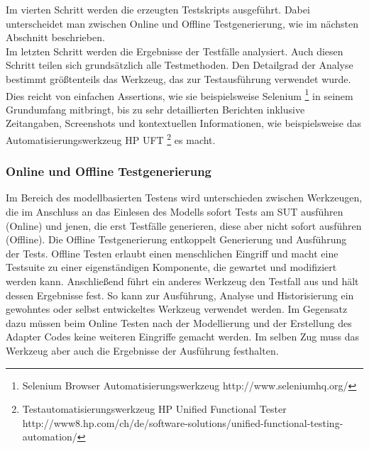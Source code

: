 Im vierten Schritt werden die erzeugten Testskripts ausgeführt. Dabei unterscheidet man zwischen Online und Offline Testgenerierung, wie im nächsten Abschnitt beschrieben.\\
Im letzten Schritt werden die Ergebnisse der Testfälle analysiert. Auch diesen Schritt teilen sich grundsätzlich alle Testmethoden. Den Detailgrad der Analyse bestimmt größtenteils das Werkzeug, das zur Testausführung verwendet wurde. Dies reicht von einfachen Assertions, wie sie beispielsweise Selenium \footnote{Selenium Browser Automatisierungswerkzeug http://www.seleniumhq.org/} in seinem Grundumfang mitbringt, bis zu sehr detaillierten Berichten inklusive Zeitangaben, Screenshots und kontextuellen Informationen, wie beispielsweise das Automatisierungswerkzeug HP UFT \footnote{Testautomatisierungswerkzeug HP Unified Functional Tester http://www8.hp.com/ch/de/software-solutions/unified-functional-testing-automation/} es macht.

\subsubsection{Online und Offline Testgenerierung}
\label{sec:online_offline}
Im Bereich des modellbasierten Testens wird unterschieden zwischen Werkzeugen, die im Anschluss an das Einlesen des Modells sofort Tests am \gls{SUT} ausführen (Online) und jenen, die erst Testfälle generieren, diese aber nicht sofort ausführen (Offline). Die Offline Testgenerierung entkoppelt Generierung und Ausführung der Tests. Offline Testen erlaubt einen menschlichen Eingriff und macht eine Testsuite zu einer eigenständigen Komponente, die gewartet und modifiziert werden kann. Anschließend führt ein anderes Werkzeug den Testfall aus und hält dessen Ergebnisse fest. So kann zur Ausführung, Analyse und Historisierung ein gewohntes oder selbst entwickeltes Werkzeug verwendet werden. Im Gegensatz dazu müssen beim Online Testen nach der Modellierung und der Erstellung des Adapter Codes keine weiteren Eingriffe gemacht werden. Im selben Zug muss das Werkzeug aber auch die Ergebnisse der Ausführung festhalten.


